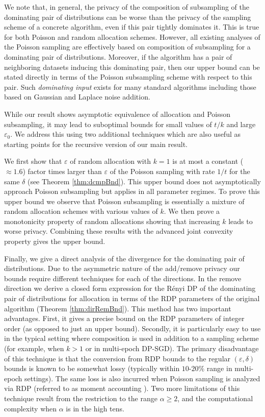 \documentclass{article}
\theoremstyle{plain}
\theoremstyle{definition}
\newcommand{\eps}{\varepsilon}
\begin{document}
We note that, in general, the privacy of the composition of subsampling of the dominating pair of distributions can be worse than the privacy of the sampling scheme of a concrete algorithm, even if this pair tightly dominates it. This is true for both Poisson and random allocation schemes. However, all existing analyses of the Poisson sampling are effectively based on composition of subsampling for a dominating pair of distributions. Moreover, if the algorithm has a pair of neighboring datasets inducing this dominating pair, then our upper bound can be stated directly in terms of the Poisson subsampling scheme with respect to this pair. Such {\em dominating input} exists for many standard algorithms including those based on Gaussian and Laplace noise addition.

While our result shows asymptotic equivalence of allocation and Poisson subsampling, it may lead to suboptimal bounds for small values of $t/k$ and large $\eps_0$. We address this using two additional techniques which are also useful as starting points for the recursive version of our main result.

We first show that $\eps$ of random allocation with $k=1$ is at most a constant ($\approx 1.6$) factor times larger than $\eps$ of the Poisson sampling with rate $1/t$ for the same $\delta$ (see Theorem \ref{thm:dcmpBnd}). This upper bound does not asymptotically approach Poisson subsampling but applies in all parameter regimes. To prove this upper bound  we observe that Poisson subsampling is essentially a mixture of random allocation schemes with various values of $k$. We then prove a monotonicity property of random allocations showing that increasing $k$ leads to worse privacy. Combining these results with the advanced joint convexity property \cite{BBG18} gives the upper bound.

Finally, we give a direct analysis of the divergence for the dominating pair of distributions. Due to the asymmetric nature of the add/remove privacy our bounds require different techniques for each of the directions. In the remove direction we derive a closed form expression for the R\'{e}nyi DP \citep{Mironov17} of the dominating pair of distributions for allocation in terms of the RDP parameters of the original algorithm (Theorem \ref{thm:dirRemBnd}). This method has two important advantages. First, it gives a precise bound on the RDP parameters of integer order (as opposed to just an upper bound). Secondly, it is particularly easy to use in the typical setting where composition is used in addition to a sampling scheme (for example, when $k>1$ or in multi-epoch DP-SGD). The primary disadvantage of this technique is that the conversion from RDP bounds to the regular $(\eps,\delta)$ bounds is known to be somewhat lossy (typically within $10$-$20\%$ range in multi-epoch settings). The same loss is also incurred when Poisson sampling is analyzed via RDP (referred to as moment accounting \citep{ACGMMT16}). Two more limitations of this technique result from the restriction to the range $\alpha \ge 2$, and the computational complexity when $\alpha$ is in the high tens.
\end{document}
